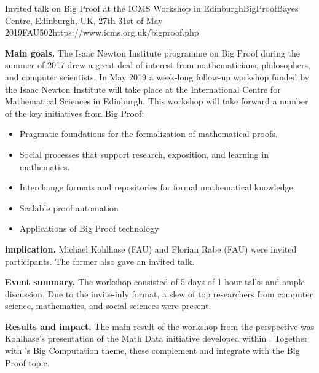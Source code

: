 \begin{event}{Invited talk on Big Proof at the ICMS Workshop in Edinburgh}{BigProof}{Bayes Centre, Edinburgh, UK, 27th-31st of May 2019}{FAU}{50}{2}{https://www.icms.org.uk/bigproof.php}

\textbf{Main goals.}
The Isaac Newton Institute programme on Big Proof during the summer of 2017 drew a great deal of interest from mathematicians, philosophers, and computer scientists.  In May 2019 a week-long follow-up workshop funded by the Isaac Newton Institute will take place at the International Centre for Mathematical Sciences in Edinburgh. This workshop will take forward a number of the key initiatives from Big Proof:

\begin{itemize}
\item Pragmatic foundations for the formalization of mathematical proofs.
\item Social processes that support research, exposition, and learning in mathematics.
\item Interchange formats and repositories for formal mathematical knowledge
\item Scalable proof automation
\item Applications of Big Proof technology
\end{itemize}

\textbf{\ODK implication.}
Michael Kohlhase (FAU) and Florian Rabe (FAU) were invited participants. The former also gave an invited talk.

\textbf{Event summary.}
The workshop consisted of 5 days of 1 hour talks and ample discussion.
Due to the invite-inly format, a slew of top researchers from computer science, mathematics, and social sciences were present.

\textbf{Results and impact.}
The main result of the workshop from the \ODK perspective was Kohlhase's presentation of the Math Data initiative developed within \ODK.
Together with \ODK's Big Computation theme, these complement and integrate with the Big Proof topic.
\end{event}
